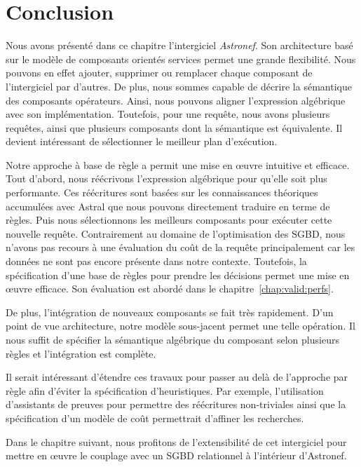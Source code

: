 \section{Conclusion}\label{sec:contrib:astronef:conclusion}
Nous avons présenté dans ce chapitre l'intergiciel \textit{Astronef}. Son architecture basé sur le modèle de composants orientés services permet une grande flexibilité. Nous pouvons en effet ajouter, supprimer ou remplacer chaque composant de l'intergiciel par d'autres. De plus, nous sommes capable de décrire la sémantique des composants opérateurs. Ainsi, nous pouvons aligner l'expression algébrique avec son implémentation. Toutefois, pour une requête, nous avons plusieurs requêtes, ainsi que plusieurs composants dont la sémantique est équivalente. Il devient intéressant de sélectionner le meilleur plan d'exécution.

Notre approche à base de règle a permit une mise en œuvre intuitive et efficace. Tout d'abord, nous réécrivons l'expression algébrique pour qu'elle soit plus performante. Ces réécritures sont basées sur les connaissances théoriques accumulées avec Astral que nous pouvons directement traduire en terme de règles. Puis nous sélectionnons les meilleurs composants pour exécuter cette nouvelle requête. Contrairement au domaine de l'optimisation des SGBD, nous n'avons pas recours à une évaluation du coût de la requête principalement car les données ne sont pas encore présente dans notre contexte. Toutefois, la spécification d'une base de règles pour prendre les décisions permet une mise en œuvre efficace. Son évaluation est abordé dans le chapitre~\ref{chap:valid:perfs}. 

De plus, l'intégration de nouveaux composants se fait très rapidement. D'un point de vue architecture, notre modèle sous-jacent permet une telle opération. Il nous suffit de spécifier la sémantique algébrique du composant selon plusieurs règles et l'intégration est complète.

Il serait intéressant d'étendre ces travaux pour passer au delà de l'approche par règle afin d'éviter la spécification d'heuristiques. Par exemple, l'utilisation d'assistants de preuves pour permettre des réécritures non-triviales ainsi que la spécification d'un modèle de coût permettrait d'affiner les recherches.

Dans le chapitre suivant, nous profitons de l'extensibilité de cet intergiciel pour mettre en œuvre le couplage avec un SGBD relationnel à l'intérieur d'Astronef.